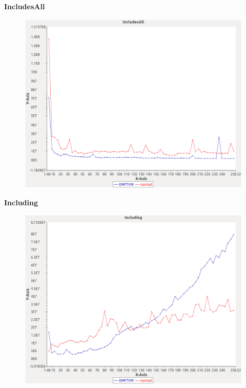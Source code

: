 \noindent\textbf{IncludesAll}

\begin{figure}[h]
\centering
\includegraphics[width=\textwidth]{../graphs/orderedset/IncludesAll}
\end{figure}
\pagebreak

\noindent\textbf{Including}

\begin{figure}[h]
\centering
\includegraphics[width=\textwidth]{../graphs/orderedset/Including}
\end{figure}
\pagebreak

